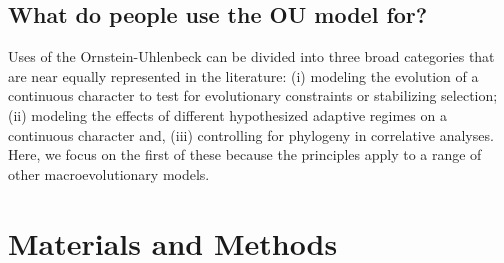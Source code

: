 \documentclass[a4paper,12pt]{article}
\begin{document}


\subsection{What do people use the OU model for?}
Uses of the Ornstein-Uhlenbeck can be divided into three broad categories that are near equally represented in the literature: (i) modeling the evolution of a continuous character to test for evolutionary constraints or stabilizing selection; (ii) modeling the effects of different hypothesized adaptive regimes on a continuous character and, (iii) controlling for phylogeny in correlative analyses. Here, we focus on the first of these because the principles apply to a range of other macroevolutionary models.  

\section{Materials and Methods}
\end{document}
